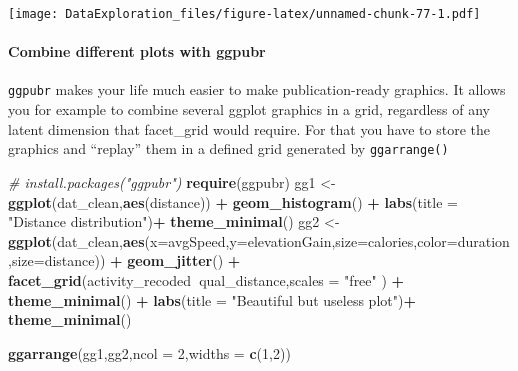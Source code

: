 \documentclass[
]{book}
\newenvironment{Shaded}{\begin{snugshade}}{\end{snugshade}}
\newcommand{\CommentTok}[1]{\textcolor[rgb]{0.56,0.35,0.01}{\textit{#1}}}
\newcommand{\DataTypeTok}[1]{\textcolor[rgb]{0.13,0.29,0.53}{#1}}
\newcommand{\DecValTok}[1]{\textcolor[rgb]{0.00,0.00,0.81}{#1}}
\newcommand{\KeywordTok}[1]{\textcolor[rgb]{0.13,0.29,0.53}{\textbf{#1}}}
\newcommand{\NormalTok}[1]{#1}
\newcommand{\OperatorTok}[1]{\textcolor[rgb]{0.81,0.36,0.00}{\textbf{#1}}}
\newcommand{\StringTok}[1]{\textcolor[rgb]{0.31,0.60,0.02}{#1}}
\begin{document}
\texttt{[image: DataExploration\_files/figure-latex/unnamed-chunk-77-1.pdf]}

\hypertarget{combine-different-plots-with-ggpubr}{%
\paragraph{Combine different plots with ggpubr}\label{combine-different-plots-with-ggpubr}}

\texttt{ggpubr} makes your life much easier to make publication-ready graphics. It allows you for example to combine several ggplot graphics in a grid, regardless of any latent dimension that facet\_grid would require. For that you have to store the graphics and ``replay'' them in a defined grid generated by \texttt{ggarrange()}

\begin{Shaded}
\begin{Highlighting}[]
\CommentTok{# install.packages("ggpubr")}
\KeywordTok{require}\NormalTok{(ggpubr)}
\NormalTok{gg1 <-}\StringTok{ }\KeywordTok{ggplot}\NormalTok{(dat_clean,}\KeywordTok{aes}\NormalTok{(distance)) }\OperatorTok{+}\StringTok{ }\KeywordTok{geom_histogram}\NormalTok{() }\OperatorTok{+}\StringTok{ }\KeywordTok{labs}\NormalTok{(}\DataTypeTok{title =} \StringTok{"Distance distribution"}\NormalTok{)}\OperatorTok{+}
\StringTok{  }\KeywordTok{theme_minimal}\NormalTok{()}
\NormalTok{gg2 <-}\StringTok{ }\KeywordTok{ggplot}\NormalTok{(dat_clean,}\KeywordTok{aes}\NormalTok{(}\DataTypeTok{x=}\NormalTok{avgSpeed,}\DataTypeTok{y=}\NormalTok{elevationGain,}\DataTypeTok{size=}\NormalTok{calories,}\DataTypeTok{color=}\NormalTok{duration,}\DataTypeTok{size=}\NormalTok{distance)) }\OperatorTok{+}\StringTok{ }
\StringTok{  }\KeywordTok{geom_jitter}\NormalTok{() }\OperatorTok{+}\StringTok{ }
\StringTok{  }\KeywordTok{facet_grid}\NormalTok{(activity_recoded}\OperatorTok{~}\NormalTok{qual_distance,}\DataTypeTok{scales =} \StringTok{"free"}\NormalTok{ ) }\OperatorTok{+}
\StringTok{  }\KeywordTok{theme_minimal}\NormalTok{() }\OperatorTok{+}\StringTok{ }\KeywordTok{labs}\NormalTok{(}\DataTypeTok{title =} \StringTok{"Beautiful but useless plot"}\NormalTok{)}\OperatorTok{+}
\StringTok{  }\KeywordTok{theme_minimal}\NormalTok{()}

\KeywordTok{ggarrange}\NormalTok{(gg1,gg2,}\DataTypeTok{ncol =} \DecValTok{2}\NormalTok{,}\DataTypeTok{widths =} \KeywordTok{c}\NormalTok{(}\DecValTok{1}\NormalTok{,}\DecValTok{2}\NormalTok{))}
\end{Highlighting}
\end{Shaded}
\end{document}
